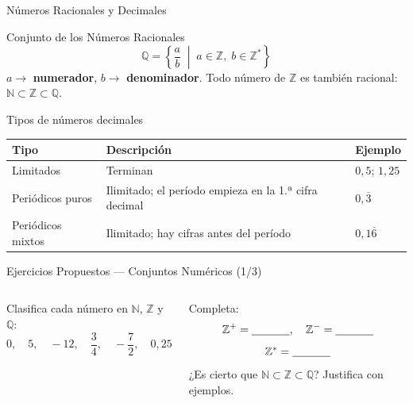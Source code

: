 \documentclass[aspectratio=169]{beamer}
\begin{document}
\begin{frame}{Números Racionales y Decimales}
  \begin{block}{Conjunto de los Números Racionales}
    \[
      \mathbb{Q} = \left\{\frac{a}{b} \;\middle|\; a \in \mathbb{Z},\;
      b \in \mathbb{Z}^{*}\right\}
    \]
    $a \to$ \textbf{numerador}, \quad $b \to$ \textbf{denominador}.
    Todo número de $\mathbb{Z}$ es también racional:
    $\mathbb{N} \subset \mathbb{Z} \subset \mathbb{Q}$.
  \end{block}
  \begin{block}{Tipos de números decimales}
    \renewcommand{\arraystretch}{1.05}
    \begin{tabular}{@{} p{3.8cm} p{6.4cm} p{2.8cm} @{}}
      \toprule
      \textbf{Tipo} & \textbf{Descripción} & \textbf{Ejemplo} \\
      \midrule
      Limitados & Terminan & $0{,}5$; $1{,}25$ \\
      Periódicos puros & Ilimitado; el período empieza en la 1.ª
        cifra decimal & $0{,}\overline{3}$ \\
      Periódicos mixtos & Ilimitado; hay cifras antes del período &
        $0{,}1\overline{6}$ \\
      \bottomrule
    \end{tabular}
  \end{block}
\end{frame}

\begin{frame}{Ejercicios Propuestos — Conjuntos Numéricos \textnormal{(1/3)}}
  \begin{columns}[T]
    \begin{mwejercicio}
      Clasifica cada número en $\mathbb{N}$, $\mathbb{Z}$ y $\mathbb{Q}$:
      \[
        0,\quad 5,\quad -12,\quad \frac{3}{4},\quad
        -\frac{7}{2},\quad 0{,}25
      \]
    \end{mwejercicio}
    \begin{mwejercicio}
      Completa:
      \[
        \mathbb{Z}^{+} = \text{\underline{\hspace{1.2cm}}},
        \quad
        \mathbb{Z}^{-} = \text{\underline{\hspace{1.2cm}}}
      \]
      \[
        \mathbb{Z}^{*} = \text{\underline{\hspace{1.2cm}}}
      \]
      ¿Es cierto que $\mathbb{N} \subset \mathbb{Z} \subset \mathbb{Q}$?
      Justifica con ejemplos.
    \end{mwejercicio}
  \end{columns}
\end{frame}
\end{document}
